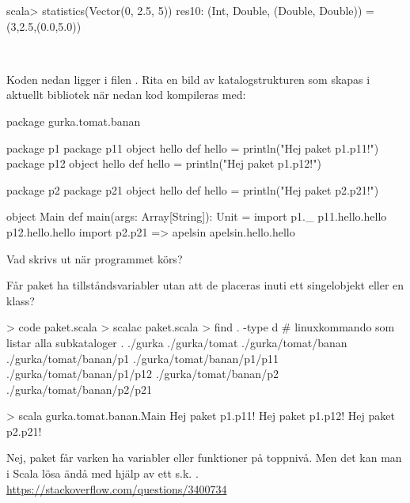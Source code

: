 \begin{REPL}
scala> statistics(Vector(0, 2.5, 5))
res10: (Int, Double, (Double, Double)) = (3,2.5,(0.0,5.0))
\end{REPL}

\QUESTEND





\QUESTBEGIN

\Task \what~

\Subtask Koden nedan ligger i filen . Rita en bild av katalogstrukturen som skapas i aktuellt bibliotek när nedan kod kompileras med: 
\begin{Code}
package gurka.tomat.banan

package p1 {
  package p11 {
    object hello {
      def hello = println("Hej paket p1.p11!")
    }
  }
  package p12 {
    object hello {
      def hello = println("Hej paket p1.p12!")
    }
  }
}

package p2 {
  package p21 {
    object hello {
      def hello = println("Hej paket p2.p21!")
    }
  }
}

object Main {
  def main(args: Array[String]): Unit = {
    import p1._
    p11.hello.hello
    p12.hello.hello
    import p2.{p21 => apelsin}
    apelsin.hello.hello
  }
}
\end{Code}

\Subtask Vad skrivs ut när programmet körs?

\Subtask Får paket ha tillståndsvariabler utan att de placeras inuti ett singelobjekt eller en klass?

\SOLUTION

\TaskSolved \what

\SubtaskSolved

\begin{REPL}
> code paket.scala
> scalac paket.scala
> find . -type d         # linuxkommando som listar alla subkataloger
.
./gurka
./gurka/tomat
./gurka/tomat/banan
./gurka/tomat/banan/p1
./gurka/tomat/banan/p1/p11
./gurka/tomat/banan/p1/p12
./gurka/tomat/banan/p2
./gurka/tomat/banan/p2/p21
\end{REPL}

\SubtaskSolved
\begin{REPL}
> scala gurka.tomat.banan.Main
Hej paket p1.p11!
Hej paket p1.p12!
Hej paket p2.p21!
\end{REPL}

\SubtaskSolved Nej, paket får varken ha variabler eller funktioner på toppnivå. Men det kan man i Scala lösa ändå med hjälp av ett s.k. . \\
 \url{https://stackoverflow.com/questions/3400734}

